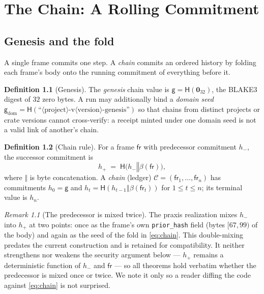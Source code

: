 \documentclass[11pt,oneside]{book}
\theoremstyle{definition}
\newtheorem{definition}{Definition}[chapter]
\theoremstyle{plain}
\theoremstyle{remark}
\newtheorem*{remark}{Remark}
\newcommand{\chainH}{\mathsf{H}}               %
\newcommand{\fr}{\mathsf{fr}}                   %
\newcommand{\body}{\beta}                       %
\newcommand{\code}[1]{\texttt{#1}}
\newcommand{\concat}{\mathbin{\Vert}}           %
\newcommand{\Genesis}{\mathsf{g}}               %
\newcommand{\Ledger}{\mathcal{C}}               %
\begin{document}
\chapter{The Chain: A Rolling Commitment}
\label{ch:chain}

\section{Genesis and the fold}

A single frame commits one step. A \emph{chain} commits an ordered history by folding each
frame's body onto the running commitment of everything before it.

\begin{definition}[Genesis]\label{def:genesis}
The \emph{genesis} chain value is $\Genesis=\chainH(\bm 0_{32})$, the BLAKE3 digest of $32$
zero bytes. A run may additionally bind a \emph{domain seed}
$\Genesis_{\mathrm{dom}}=\chainH(\text{``}\langle\text{project}\rangle\text{-v}\langle
\text{version}\rangle\text{-genesis''})$ so that chains from distinct projects or crate
versions cannot cross-verify: a receipt minted under one domain seed is not a valid link of
another's chain.
\end{definition}

\begin{definition}[Chain rule]\label{def:chain}
For a frame $\fr$ with predecessor commitment $h_{-}$, the successor commitment is
\begin{equation}\label{eq:chain}
h_{+} \;=\; \chainH\bigl(h_{-}\concat\body(\fr)\bigr),
\end{equation}
where $\concat$ is byte concatenation. A \emph{chain} (ledger) $\Ledger=(\fr_1,\dots,\fr_n)$
has commitments $h_0=\Genesis$ and $h_t=\chainH(h_{t-1}\concat\body(\fr_t))$ for
$1\le t\le n$; its terminal value is $h_n$.
\end{definition}

\begin{remark}[The predecessor is mixed twice]
The praxis realization mixes $h_{-}$ into $h_{+}$ at two points: once as the frame's own
\code{prior\_hash} field (bytes $[67,99)$ of the body) and again as the seed of the fold in
\eqref{eq:chain}. This double-mixing predates the current construction and is retained for
compatibility. It neither strengthens nor weakens the security argument below --- $h_{+}$
remains a deterministic function of $h_{-}$ and $\fr$ --- so all theorems hold verbatim
whether the predecessor is mixed once or twice. We note it only so a reader diffing the code
against \eqref{eq:chain} is not surprised.
\end{remark}
\end{document}
